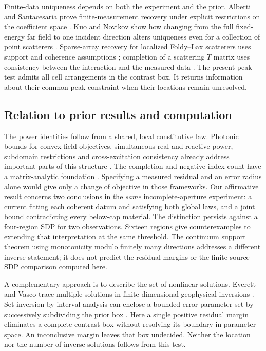 \documentclass[anonymous,12pt]{iopjournal}
\theoremstyle{remark}\newtheorem{remark}[theorem]{Remark}
\numberwithin{equation}{section}
\begin{document}
Finite-data uniqueness depends on both the experiment and the prior. Alberti and Santacesaria prove finite-measurement recovery under explicit restrictions on the coefficient space \cite{alberti19,alberti21}. Kuo and Novikov show how changing from the full fixed-energy far field to one incident direction alters uniqueness even for a collection of point scatterers \cite{kuo_novikov}. Sparse-array recovery for localized Foldy--Lax scatterers uses support and coherence assumptions \cite{chai}; completion of a scattering $T$ matrix uses consistency between the interaction and the measured data \cite{levinson}. The present peak test admits all cell arrangements in the contrast box. It returns information about their common peak constraint when their locations remain unresolved.

\subsection{Relation to prior results and computation}
The power identities follow from a shared, local constitutive law. Photonic bounds for convex field objectives, simultaneous real and reactive power, subdomain restrictions and cross-excitation consistency already address important parts of this structure \cite{trivedi,moleskyglobal,moleskylocal,shim}. The completion and negative-index count have a matrix-analytic foundation \cite{tian}. Specifying a measured residual and an error radius alone would give only a change of objective in those frameworks. Our affirmative result concerns two conclusions in the \emph{same} incomplete-aperture experiment: a current fitting each coherent datum and satisfying both global laws, and a joint bound contradicting every below-cap material. The distinction persists against a four-region SDP for two observations. Sixteen regions give counterexamples to extending that interpretation at the same threshold. The continuum support theorem using monotonicity modulo finitely many directions \cite{albicker} addresses a different inverse statement; it does not predict the residual margins or the finite-source SDP comparison computed here.

A complementary approach is to describe the set of nonlinear solutions. Everett and Vasco trace multiple solutions in finite-dimensional geophysical inversions \cite{everett96,vasco,everett26}. Set inversion by interval analysis can enclose a bounded-error parameter set by successively subdividing the prior box \cite{sivia}. Here a single positive residual margin eliminates a complete contrast box without resolving its boundary in parameter space. An inconclusive margin leaves that box undecided. Neither the location nor the number of inverse solutions follows from this test.
\end{document}
